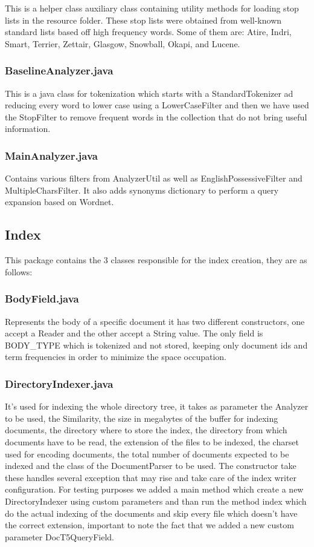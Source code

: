             This is a helper class auxiliary class containing utility methods for loading stop lists in the resource folder. These stop lists were obtained from well-known standard lists based off high frequency words. Some of them are: Atire, Indri, Smart, Terrier, Zettair, Glasgow, Snowball, Okapi, and Lucene. 
\subsubsection{BaselineAnalyzer.java}
            
            This is a java class for tokenization which starts with a StandardTokenizer ad reducing every word to lower case using a LowerCaseFilter and then we have used the StopFilter to remove frequent words in the collection that do not bring useful information. 
\subsubsection{MainAnalyzer.java}
            
            Contains various filters from AnalyzerUtil as well as EnglishPossessiveFilter and MultipleCharsFilter. It also adds synonyms dictionary to perform a query expansion based on Wordnet.
\subsection{Index}
  
     This package contains the 3 classes responsible for the index creation, they are as follows: 
     
\subsubsection{BodyField.java}
    
        Represents the body of a specific document it has two different constructors, one accept a Reader and the other accept a String value. The only field is BODY\_TYPE  which is tokenized and not stored, keeping only document ids and term frequencies in order to minimize the space occupation. 
\subsubsection{DirectoryIndexer.java}
    
        It's used for indexing the whole directory tree, it takes as parameter the Analyzer to be used, the Similarity, the size in megabytes of the buffer for indexing documents, the directory where to store the index, the directory from which documents have to be read, the extension of the files to be indexed, the charset used for encoding documents, the total number of documents expected to be indexed and the class of the DocumentParser to be used. The constructor take these handles several exception that may rise and take care of the index writer configuration. For testing purposes we added a main method which create a new DirectoryIndexer using custom parameters and than run the method index which do the actual indexing of the documents and skip every file which doesn't have the correct extension, important to note the fact that we added a new custom parameter DocT5QueryField. 
